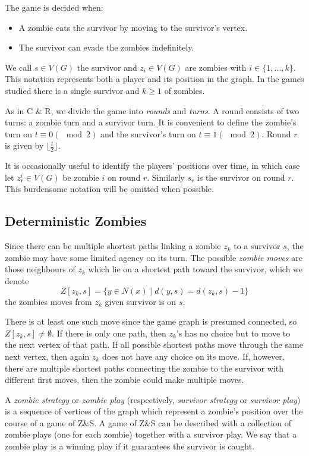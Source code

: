 The game is decided when:
\begin{itemize}
\item A zombie eats the survivor by moving to the survivor's vertex.
\item The survivor can evade the zombies indefinitely.
\end{itemize}

We call $s \in V(G)$ the survivor and $z_i \in V(G)$ are zombies with $i \in \{1, \dots, k\}$.
This notation represents both a player and its position in the graph.
In the games studied there is a single survivor and $k \geq 1$ of zombies.

As in C \& R, we divide the game into \textit{rounds} and \textit{turns}. A round consists of two turns: a zombie turn and a survivor turn.
It is convenient to define the zombie's turn on $t \equiv 0 (\mod{2})$ and the survivor's turn on $t \equiv 1 (\mod{2})$.
Round $r$ is given by $\lfloor \frac{t}{2} \rfloor$.

It is occasionally useful to identify the players' positions over time, in which
case let $z_r^i \in V(G)$ be zombie $i$ on round $r$. Similarly $s_r$ is the
survivor on round $r$. This burdensome notation will be omitted when possible.

\subsection{Deterministic Zombies}\label{subsection intro deterministic}

Since there can be multiple shortest paths linking a zombie $z_k$ to a survivor $s$, the zombie may have some limited agency on its turn. The possible \textit{zombie moves}
are those neighbours of $z_k$ which lie on a shortest path toward the survivor, which we denote
\[ Z[z_k, s] = \{ y \in N(x) \mid d(y, s) = d(z_k, s) - 1 \} \]
the zombies moves from $z_k$ given survivor is on $s$.

There is at least one such move since the game graph is presumed connected,
so $Z[z_k,s] \neq \emptyset$. If there is only one path, then $z_k$'s has no choice but to move to the next vertex of that path. If all possible shortest paths move through the same next vertex, then again $z_k$ does not have any choice on its move. If, however, there are multiple shortest paths connecting the zombie to the survivor with different first moves, then the zombie could make multiple moves.

A \textit{zombie strategy} or \textit{zombie play} (respectively, \textit{survivor strategy} or \textit{survivor play}) is a sequence of vertices of the graph which represent a zombie's position over the course of a game of Z\&S. A game of Z\&S can be described with a collection of zombie plays (one for each zombie) together with a survivor play. We say that a zombie play is a winning play if it guarantees the survivor is caught.

